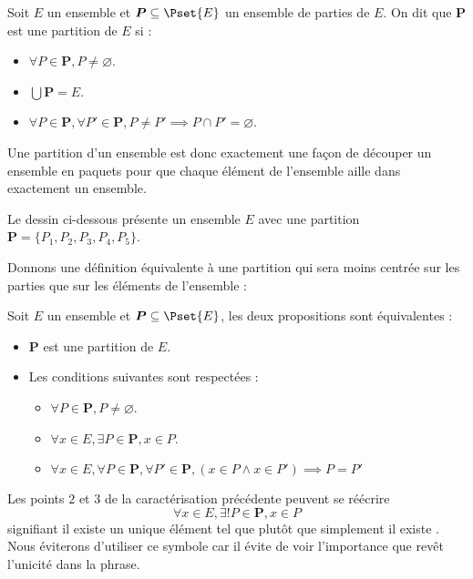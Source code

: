 \begin{defi}
    Soit $E$ un ensemble et $\boldsymbol P\subseteq \Pset{E}$ un ensemble de parties de $E$. On dit que $\boldsymbol P$ est une partition de $E$ si :
    \begin{itemize}[label=$\bullet$]
        \item $\forall P\in\boldsymbol P, P\neq\varnothing$.
        \item $\displaystyle{\bigcup \boldsymbol P = E}$.
        \item $\forall P\in\boldsymbol P, \forall P'\in\boldsymbol P, P\neq P'\implies P\cap P'=\varnothing$.
    \end{itemize}
    
    Une partition d'un ensemble est donc exactement une façon de découper un ensemble en paquets pour que chaque élément de l'ensemble aille dans exactement un ensemble.
\end{defi}

Le dessin ci-dessous présente un ensemble $E$ avec une partition $\boldsymbol P = \{P_1,P_2,P_3,P_4,P_5\}$.



Donnons une définition équivalente à une partition qui sera moins centrée sur les parties que sur les éléments de l'ensemble :

\begin{prop}
    Soit $E$ un ensemble et $\boldsymbol P\subseteq \Pset{E}$, les deux propositions sont équivalentes :
    \begin{itemize}[label=$\bullet$]
        \item $\boldsymbol P$ est une partition de $E$.
        \item Les conditions suivantes sont respectées :
        \begin{itemize}
            \item $\forall P\in\boldsymbol P, P\neq \varnothing$.
            \item $\forall x\in E, \exists P \in\boldsymbol P, x\in P$.
            \item $\forall x\in E, \forall P\in\boldsymbol P, \forall P'\in\boldsymbol P, (x\in P \land x\in P')\implies P=P'$
        \end{itemize}
    \end{itemize}
\end{prop}

\begin{rmk}
    Les points $2$ et $3$ de la caractérisation précédente peuvent se réécrire $$\forall x\in E, \exists ! P\in\boldsymbol P, x\in P$$ signifiant \og il existe un unique élément tel que\fg{} plutôt que simplement \og il existe \fg{}. Nous éviterons d'utiliser ce symbole car il évite de voir l'importance que revêt l'unicité dans la phrase.
\end{rmk}

